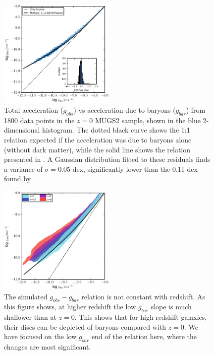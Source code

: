 \begin{figure}
    \includegraphics[width=0.5\textwidth]{figures4/SPARC_plot.eps}
    \caption{Total acceleration ($g_{obs}$) vs acceleration due to baryons
    ($g_{bar}$) from 1800 data points in the $z=0$ MUGS2 sample, shown in the
    blue 2-dimensional histogram.  The dotted black curve shows the 1:1 relation
    expected if the acceleration was due to baryons alone (without dark matter),
    while the solid line shows the relation presented in \citet{McGaugh2016}.
    A Gaussian distribution fitted to these residuals finds a
    variance of $\sigma=0.05$ dex, significantly lower than the 0.11 dex found
    by \citet{McGaugh2016}.} \label{SPARC_plot}
\end{figure}
\begin{figure}
    \includegraphics[width=0.5\textwidth]{figures4/redshift_evolution.eps}
    \caption{The  simulated $g_{obs}-g_{bar}$ relation is not constant with
    redshift.  As this figure shows, at higher redshift the low $g_{bar}$ slope
    is much shallower than at $z=0$.  This shows that for high redshift
    galaxies, their discs can be depleted of baryons compared with $z=0$.  We
    have focused on the low $g_{bar}$ end of the relation here, where the
    changes are most significant.}
    \label{redshift_evolution}
\end{figure}
